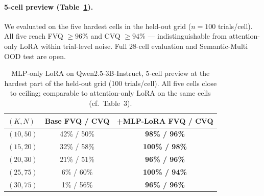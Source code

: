 \documentclass[letterpaper]{article} %
\begin{document}
\paragraph{5-cell preview (Table~\ref{tab:mlp_lora}).}
We evaluated on the five hardest cells in the held-out grid
($n=100$ trials/cell). All five reach FVQ $\ge 96\%$ and
CVQ $\ge 94\%$ --- indistinguishable from attention-only LoRA
within trial-level noise. Full 28-cell evaluation and
Semantic-Multi OOD test are open.

\begin{table}[!htbp]
\centering
\footnotesize
\setlength{\tabcolsep}{4pt}
\begin{tabular}{lcc}
\toprule
$(K, N)$ & \textbf{Base FVQ / CVQ} & \textbf{+MLP-LoRA FVQ / CVQ} \\
\midrule
$(10, 50)$ & 42\% / 50\% & \textbf{98\% / 96\%} \\
$(15, 20)$ & 32\% / 58\% & \textbf{100\% / 98\%} \\
$(20, 30)$ & 21\% / 51\% & \textbf{96\% / 96\%} \\
$(25, 75)$ &  6\% / 60\% & \textbf{100\% / 94\%} \\
$(30, 75)$ &  1\% / 56\% & \textbf{96\% / 96\%} \\
\bottomrule
\end{tabular}
\caption{MLP-only LoRA on Qwen2.5-3B-Instruct, 5-cell preview at
the hardest part of the held-out grid (100 trials/cell). All five
cells close to ceiling; comparable to attention-only LoRA on the
same cells (cf.\ Table~3).}
\label{tab:mlp_lora}
\end{table}





\end{document}
